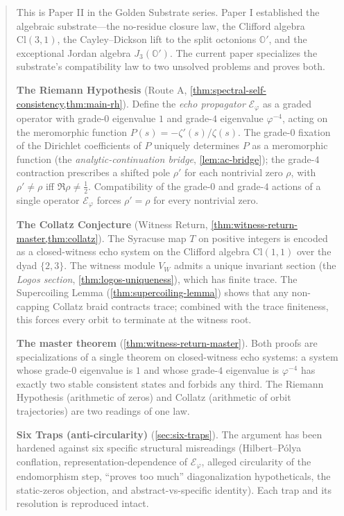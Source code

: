 \documentclass[11pt,a4paper]{article}
\theoremstyle{plain}
\theoremstyle{definition}
\theoremstyle{remark}
\numberwithin{equation}{section}
\providecommand{\Cl}{\mathrm{Cl}}
\providecommand{\Os}{\mathbb{O}'}
\providecommand{\vp}{\varphi}
\providecommand{\half}{\tfrac{1}{2}}
\providecommand{\EF}{\mathcal{E}}
\begin{document}
\begin{abstract}
\noindent
This is Paper II in the Golden Substrate series.  Paper I established the
algebraic substrate---the no-residue closure law, the Clifford
algebra $\Cl(3,1)$, the Cayley--Dickson lift to the split octonions
$\Os$, and the exceptional Jordan algebra $J_3(\Os)$.  The current
paper specializes the substrate's compatibility law to two
unsolved problems and proves both.

\medskip\noindent\textbf{The Riemann Hypothesis} (Route A,
\cref{thm:spectral-self-consistency,thm:main-rh}).
Define the \emph{echo propagator} $\EF_\vp$ as a graded operator
with grade-$0$ eigenvalue $1$ and grade-$4$ eigenvalue $\vp^{-4}$,
acting on the meromorphic function
$P(s) = -\zeta'(s)/\zeta(s)$.  The grade-$0$ fixation of the
Dirichlet coefficients of $P$ uniquely determines $P$ as a
meromorphic function (the \emph{analytic-continuation bridge},
\cref{lem:ac-bridge}); the grade-$4$ contraction prescribes a
shifted pole $\rho'$ for each nontrivial zero $\rho$, with
$\rho' \ne \rho$ iff $\Re\rho \ne \half$.  Compatibility of the
grade-$0$ and grade-$4$ actions of a single operator
$\EF_\vp$ forces $\rho' = \rho$ for every nontrivial zero.

\medskip\noindent\textbf{The Collatz Conjecture} (Witness Return,
\cref{thm:witness-return-master,thm:collatz}).  The Syracuse map
$T$ on positive integers is encoded as a closed-witness echo
system on the Clifford algebra $\Cl(1,1)$ over the dyad
$\{2, 3\}$.  The witness module $V_W$ admits a unique invariant
section (the \emph{Logos section}, \cref{thm:logos-uniqueness}),
which has finite trace.  The Supercoiling Lemma
(\cref{thm:supercoiling-lemma}) shows that any non-capping Collatz braid
contracts trace; combined with the trace finiteness, this forces
every orbit to terminate at the witness root.

\medskip\noindent\textbf{The master theorem}
(\cref{thm:witness-return-master}).  Both proofs are
specializations of a single theorem on closed-witness echo
systems: a system whose grade-$0$ eigenvalue is $1$ and whose
grade-$4$ eigenvalue is $\vp^{-4}$ has exactly two stable
consistent states and forbids any third.  The Riemann Hypothesis
(arithmetic of zeros) and Collatz (arithmetic of orbit
trajectories) are two readings of one law.

\medskip\noindent\textbf{Six Traps (anti-circularity)}
(\cref{sec:six-traps}).  The argument has been hardened against
six specific structural misreadings (Hilbert--P\'olya conflation,
representation-dependence of $\EF_\vp$, alleged circularity of
the endomorphism step, ``proves too much'' diagonalization
hypotheticals, the static-zeros objection, and abstract-vs-specific
identity).  Each trap and its resolution is reproduced intact.


\end{abstract}
\end{document}
